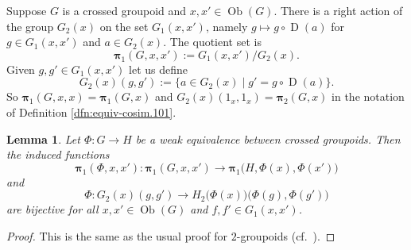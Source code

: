 \documentclass[a4paper,10pt]{amsart}
\newtheorem{lem}[equation]{Lemma}
\theoremstyle{definition}
\numberwithin{equation}{section}
\newcommand{\opn}{\operatorname}
\newcommand{\bsym}[1]{\boldsymbol{#1}}
\begin{document}
Suppose $G$ is a crossed groupoid and $x, x' \in \opn{Ob}(G)$.
There is a right action of the group $G_2(x)$ on the set 
$G_1(x, x')$, namely 
$g \mapsto g \circ \opn{D}(a)$ for $g \in G_1(x, x')$
and $a \in G_2(x)$. The quotient set is 
\begin{equation}
\bsym{\bsym{\pi}}_1(G, x, x') := G_1(x, x') / G_2(x) . 
\end{equation}
Given $g, g' \in G_1(x, x')$ let us define 
\begin{equation}
G_2(x)(g, g') := \{ a \in G_2(x) \mid 
g' = g \circ \opn{D}(a) \} . 
\end{equation}
So $\bsym{\bsym{\pi}}_1(G, x, x) = \bsym{\bsym{\pi}}_1(G, x)$ and 
$G_2(x)(1_x, 1_x) = \bsym{\bsym{\pi}}_2(G, x)$
in the notation of Definition \ref{dfn:equiv-cosim.101}.

\begin{lem} \label{lem:cosim-equiv.100}
Let $\Phi : G \to H$ be a weak equivalence between crossed
groupoids. Then the induced functions 
\[ \bsym{\bsym{\pi}}_1(\Phi, x, x') : \bsym{\bsym{\pi}}_1(G, x, x') \to
\bsym{\bsym{\pi}}_1 \bigl( H, \Phi(x), \Phi(x') \bigr)  \]
and 
\[ \Phi : G_2(x)(g, g') \to 
H_2 \bigl( \Phi(x) \bigr) \bigl( \Phi(g), \Phi(g') \bigr) \]
are bijective for all $x, x' \in \opn{Ob}(G)$ and 
$f, f' \in G_1(x, x')$. 
\end{lem}

\begin{proof}
This is the same as the usual proof for $2$-groupoids (cf.\ 
\cite[Lemma 1.1]{MS}).
\end{proof}
\end{document}
